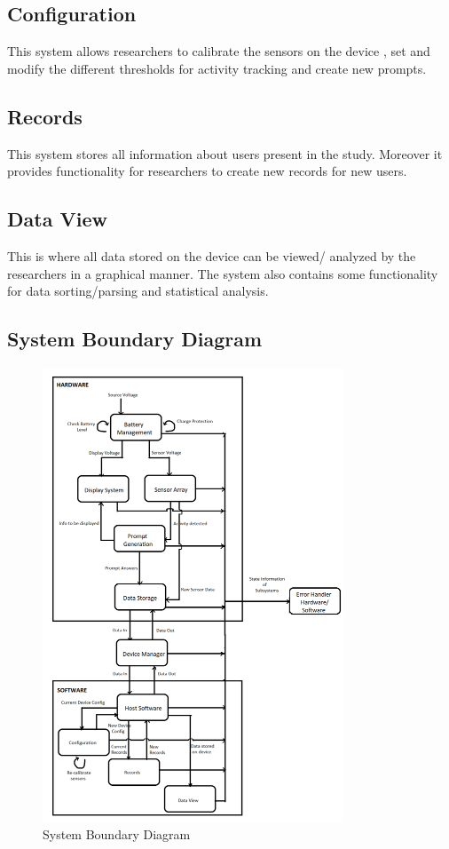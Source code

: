 \documentclass{article}
\begin{document}
\subsection{\label{Configuration_sec}Configuration}
This system allows researchers to calibrate the sensors on the device , set and modify the different thresholds for activity tracking and create new prompts.

\subsection{\label{Records_sec}Records}
This system stores all information about users present in the study. Moreover it provides functionality for researchers to create new records for new users.

\subsection{\label{View_sec}Data View}
This is where all data stored on the device can be viewed/ analyzed by the researchers in a graphical manner. The system also contains some functionality for data sorting/parsing and statistical analysis.


\subsection{System Boundary Diagram}
\begin{figure}[H]
	\begin{center}
		\includegraphics[width=0.80\textwidth]{SystemBoundaryDiagram}
		\caption{System Boundary Diagram}
		\label{Fig_SBD}
	\end{center}
\end{figure}
\end{document}
